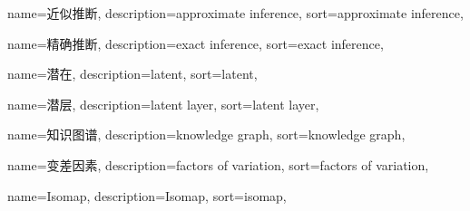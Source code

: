 {
  name=近似推断,
  description={approximate inference},
  sort={approximate inference},
}

{
  name=精确推断,
  description={exact inference},
  sort={exact inference},
}

{
  name=潜在,
  description={latent},
  sort={latent},
}

{
  name=潜层,
  description={latent layer},
  sort={latent layer},
}

{
  name=知识图谱,
  description={knowledge graph},
  sort={knowledge graph},
}

{
  name=变差因素,
  description={factors of variation},
  sort={factors of variation},
}

{
  name=Isomap,
  description={Isomap},
  sort={isomap},
}
